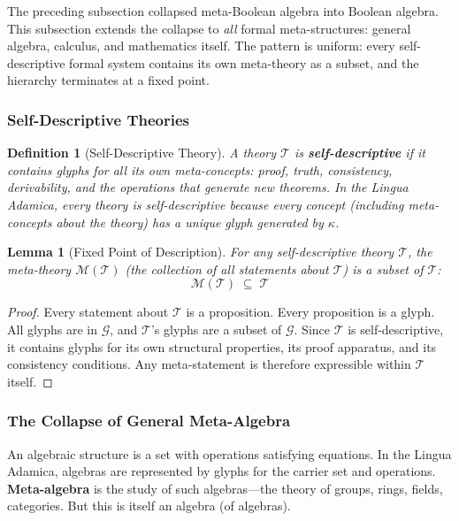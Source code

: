 \documentclass[12pt, letterpaper]{book}
\newtheorem{lemma}[theorem]{Lemma}
\newtheorem{definition}{Definition}[chapter]
\begin{document}
The preceding subsection collapsed meta-Boolean algebra into Boolean algebra. This subsection extends the collapse to \textit{all} formal meta-structures: general algebra, calculus, and mathematics itself. The pattern is uniform: every self-descriptive formal system contains its own meta-theory as a subset, and the hierarchy terminates at a fixed point.

\subsubsection{Self-Descriptive Theories}

\begin{definition}[Self-Descriptive Theory]\label{def:self-descriptive}
A theory $\mathcal{T}$ is \textbf{self-descriptive} if it contains glyphs for all its own meta-concepts: proof, truth, consistency, derivability, and the operations that generate new theorems. In the Lingua Adamica, every theory is self-descriptive because every concept (including meta-concepts about the theory) has a unique glyph generated by $\kappa$.
\end{definition}

\begin{lemma}[Fixed Point of Description]\label{lem:description-fp}
For any self-descriptive theory $\mathcal{T}$, the meta-theory $\mathcal{M}(\mathcal{T})$ (the collection of all statements about $\mathcal{T}$) is a subset of $\mathcal{T}$:
\[
\mathcal{M}(\mathcal{T}) \;\subseteq\; \mathcal{T}
\]
\end{lemma}

\begin{proof}
Every statement about $\mathcal{T}$ is a proposition. Every proposition is a glyph. All glyphs are in $\mathcal{G}$, and $\mathcal{T}$'s glyphs are a subset of $\mathcal{G}$. Since $\mathcal{T}$ is self-descriptive, it contains glyphs for its own structural properties, its proof apparatus, and its consistency conditions. Any meta-statement is therefore expressible within $\mathcal{T}$ itself.
\end{proof}

\subsubsection{The Collapse of General Meta-Algebra}

An algebraic structure is a set with operations satisfying equations. In the Lingua Adamica, algebras are represented by glyphs for the carrier set and operations. \textbf{Meta-algebra} is the study of such algebras---the theory of groups, rings, fields, categories. But this is itself an algebra (of algebras).
\end{document}
